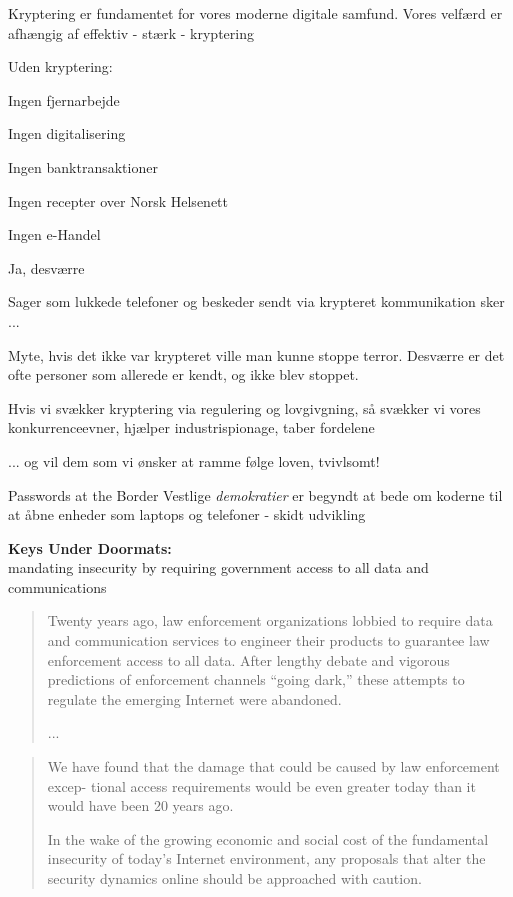 \documentclass[20pt,landscape,a4paper,footrule]{foils}
\begin{document}

Kryptering er fundamentet for vores moderne digitale samfund. Vores velfærd er afhængig af effektiv - stærk - kryptering

Uden kryptering:
\begin{list2}
\item Ingen fjernarbejde
\item Ingen digitalisering
\item Ingen banktransaktioner
\item Ingen recepter over Norsk Helsenett
\item Ingen e-Handel
\end{list2}


Ja, desværre

Sager som lukkede telefoner og beskeder sendt via krypteret kommunikation sker ...

Myte, hvis det ikke var krypteret ville man kunne stoppe terror. Desværre er det ofte personer som allerede er kendt, og ikke blev stoppet.

Hvis vi svækker kryptering via regulering og lovgivgning, så svækker vi vores konkurrenceevner, hjælper industrispionage, taber fordelene

... og vil dem som vi ønsker at ramme følge loven, tvivlsomt!


Passwords at the Border
Vestlige \emph{demokratier} er begyndt at bede om koderne til at åbne enheder som laptops og telefoner - skidt udvikling

{\bf Keys Under Doormats:}\\
mandating insecurity by requiring government access to all
data and communications

\begin{quote}
Twenty years ago, law enforcement organizations lobbied to require data and
communication services to engineer their products to guarantee law enforcement
access to all data. After lengthy debate and vigorous predictions of enforcement
channels “going dark,” these attempts to regulate the emerging Internet were abandoned.

...
\end{quote}


\begin{quote}
We have found that the damage that could be caused by law enforcement excep-
tional access requirements would be even greater today than it would have been 20
years ago.

In the wake of the growing economic and social cost of the fundamental
insecurity of today’s Internet environment, any proposals that alter the security dynamics online should be approached with caution.
\end{quote}
\end{document}
